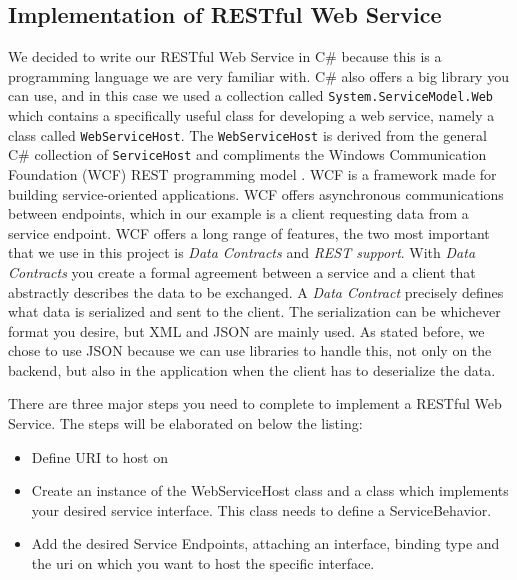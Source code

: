 \subsection{Implementation of RESTful Web Service}
\label{subsec:restImpl}

We decided to write our RESTful Web Service in C\# because this is a programming language we are very familiar with. C\# also offers a big library you can use, and in this case we used a collection called \texttt{System.ServiceModel.Web} which contains a specifically useful class for developing a web service, namely a class called \texttt{WebServiceHost}. The \texttt{WebServiceHost} is derived from the general C\# collection of \texttt{ServiceHost} and compliments the Windows Communication Foundation (WCF) REST programming model .
WCF is a framework made for building service-oriented applications. WCF offers asynchronous communications between endpoints, which in our example is a client requesting data from a service endpoint. WCF offers a long range of features, the two most important that we use in this project is \textit{Data Contracts} and \textit{REST support}. 
With \textit{Data Contracts} you create a formal agreement between a service and a client that abstractly describes the data to be exchanged. A \textit{Data Contract} precisely defines what data is serialized and sent to the client. The serialization can be whichever format you desire, but XML and JSON are mainly used. As stated before, we chose to use JSON because we can use libraries to handle this, not only on the backend, but also in the application when the client has to deserialize the data.

There are three major steps you need to complete to implement a RESTful Web Service. The steps will be elaborated on below the listing:
\begin{itemize}
\item Define URI to host on
\item Create an instance of the WebServiceHost class and a class which implements your desired service interface. This class needs to define a ServiceBehavior.
\item Add the desired Service Endpoints, attaching an interface, binding type and the uri on which you want to host the specific interface.
\end{itemize}

